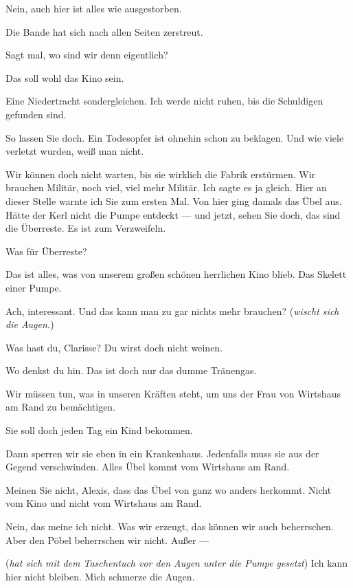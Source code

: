 \documentclass[
	final,
	a4paper,
	ngerman,
	mpinclude = true, %
	twoside = true,
	open = right,
	cleardoublepage = plain,
	DIV = 13,
	BCOR = 1cm,
	titlepage = firstiscover,
	]{scrbook}
\newcommand{\direction}[1]{(\textit{#1})}
\newcommand{\thecharacter}[1]{\textup{\textsc{#1}}\xspace}
\newcommand{\theClarisse}{\thecharacter{Clarisse}}
\newcommand{\theAlexis}{\thecharacter{Alexis}}
\newcommand{\character}[1]{\item[#1]}
\newcommand{\Generaldirektor}{\character{Direktor}}
\newcommand{\Clarisse}{\character{\theClarisse}}
\newcommand{\Alexis}{\character{\theAlexis}}
\begin{document}
\begin{play}

\Generaldirektor
Nein, auch hier ist alles wie ausgestorben.

\Alexis
Die Bande hat sich nach allen Seiten zerstreut.

\Clarisse
Sagt mal, wo sind wir denn eigentlich?

\Generaldirektor
Das soll wohl das Kino sein.

\Alexis
Eine Niedertracht sondergleichen. Ich werde nicht ruhen, bis die Schuldigen gefunden sind.

\Generaldirektor
So lassen Sie doch. Ein Todesopfer ist ohnehin schon zu beklagen. Und wie viele verletzt wurden, weiß man nicht.

\Alexis
Wir können doch nicht warten, bis sie wirklich die Fabrik erstürmen. Wir brauchen Militär, noch viel, viel mehr Militär. Ich sagte es ja gleich. Hier an dieser Stelle warnte ich Sie zum ersten Mal. Von hier ging damals das Übel aus. Hätte der Kerl nicht die Pumpe entdeckt --- und jetzt, sehen Sie doch, das sind die Überreste. Es ist zum Verzweifeln.

\Clarisse
Was für Überreste?

\Alexis
Das ist alles, was von unserem großen schönen herrlichen Kino blieb. Das Skelett einer Pumpe.

\Clarisse
Ach, interessant. Und das kann man zu gar nichts mehr brauchen? \direction{wischt sich die Augen.}

\Generaldirektor
Was hast du, Clarisse? Du wirst doch nicht weinen.

\Clarisse
Wo denkst du hin. Das ist doch nur das dumme Tränengas.

\Alexis
Wir müssen tun, was in unseren Kräften steht, um uns der Frau von Wirtshaus am Rand zu bemächtigen.

\Generaldirektor
Sie soll doch jeden Tag ein Kind bekommen.

\Alexis
Dann sperren wir sie eben in ein Krankenhaus. Jedenfalls muss sie aus der Gegend verschwinden. Alles Übel kommt vom Wirtshaus am Rand.

\Generaldirektor
Meinen Sie nicht, Alexis, dass das Übel von ganz wo anders herkommt. Nicht vom Kino und nicht vom Wirtshaus am Rand.

\Alexis
Nein, das meine ich nicht. Was wir erzeugt, das können wir auch beherrschen. Aber den Pöbel beherrschen wir nicht. Außer ---

\Clarisse
\direction{hat sich mit dem Taschentuch vor den Augen unter die Pumpe gesetzt} Ich kann hier nicht bleiben. Mich schmerze die Augen.


\end{play}
\end{document}
